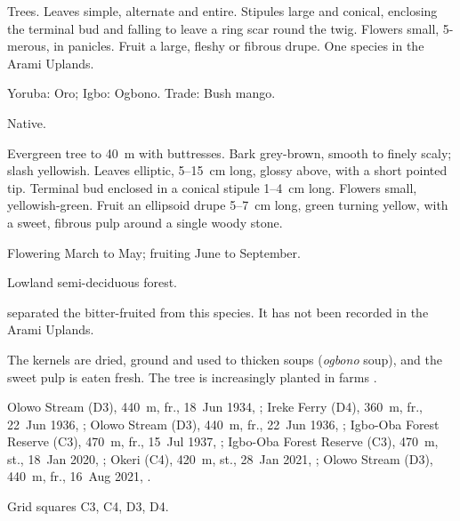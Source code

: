 \label{fam:irvingiaceae}

Trees. Leaves simple, alternate and entire. Stipules large and
conical, enclosing the terminal bud and falling to leave a ring scar
round the twig. Flowers small, 5-merous, in panicles. Fruit a large,
fleshy or fibrous drupe. One species in the Arami Uplands.

\label{sp:IRV01}

 

 Yoruba: Oro; Igbo: Ogbono. Trade: Bush
mango.

 Native.

 Evergreen tree to 40~m with buttresses. Bark
grey-brown, smooth to finely scaly; slash yellowish. Leaves elliptic,
5--15~cm long, glossy above, with a short pointed tip. Terminal bud
enclosed in a conical stipule 1--4~cm long. Flowers small,
yellowish-green. Fruit an ellipsoid drupe 5--7~cm long, green turning
yellow, with a sweet, fibrous pulp around a single woody stone.

 Flowering March to May; fruiting June to September.

 Lowland semi-deciduous forest.

 \citet{harris1996} separated the bitter-fruited
 from this species. It has not
been recorded in the Arami Uplands.

 The kernels are dried, ground and used to thicken soups
(\textit{ogbono} soup), and the sweet pulp is eaten fresh. The tree is
increasingly planted in farms \citep{orwa2009}.

 Olowo Stream (D3), 440~m, fr., 18~Jun 1934, ;
Ireke Ferry (D4), 360~m, fr., 22~Jun 1936, ;
Olowo Stream (D3), 440~m, fr., 22~Jun 1936, ;
Igbo-Oba Forest Reserve (C3), 470~m, fr., 15~Jul 1937, ;
Igbo-Oba Forest Reserve (C3), 470~m, st., 18~Jan 2020, ;
Okeri (C4), 420~m, st., 28~Jan 2021, ;
Olowo Stream (D3), 440~m, fr., 16~Aug 2021, .

 Grid squares C3, C4, D3, D4.

\begin{center}
\end{center}

